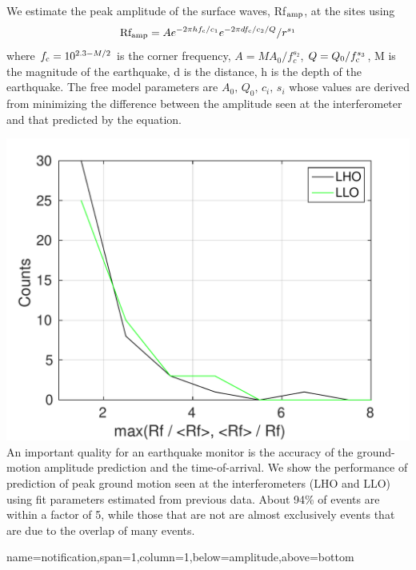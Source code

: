 \documentclass[a0paper,portrait]{baposter}
\begin{document}
\begin{poster}
{We estimate the peak amplitude of the surface waves, Rf$_{\rm amp}$, at the sites using
\begin{equation}
{\rm Rf_{amp}} = A e^{-2 \pi h f_{\rm c}/c_1}e^{-2 \pi d f_{\rm c}/c_2/Q}/r^{s_1}
\label{eq:Rfamp}
\end{equation}
where $f_{\rm c} = 10^{2.3-M/2}$ is the corner frequency, $A = M A_0/f_c^{s_2}$, $Q=Q_0/f_{\rm c}^{s_3}$, M is the magnitude of the earthquake, d is the distance, h is the depth of the earthquake. The free model parameters are $A_0,\,Q_0,\,c_i,\,s_i$ whose values are derived from minimizing the difference between the amplitude seen at the interferometer and that predicted by the equation.

 \includegraphics[width=0.99\linewidth]{plots/pred_diff.pdf}
An important quality for an earthquake monitor is the accuracy of the ground-motion amplitude prediction and the time-of-arrival. We show the performance of prediction of peak ground motion seen at the interferometers (LHO and LLO) using fit parameters estimated from previous data. About 94\% of events are within a factor of 5, while those that are not are almost exclusively events that are due to the overlap of many events. 

}

{name=notification,span=1,column=1,below=amplitude,above=bottom}{

}
\end{poster}
\end{document}
